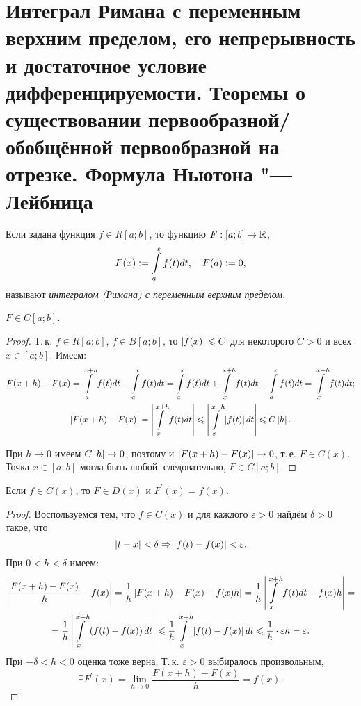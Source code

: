 \section{Интеграл Римана с переменным верхним пределом, его непрерывность и достаточное условие дифференцируемости. Теоремы о существовании первообразной/обобщённой первообразной на отрезке. Формула Ньютона "---Лейбница}

\begin{definition}
    Если задана функция $f \in R[a; b]$, то функцию $F: [a; b] \to \mathbb{R}$,
    \[
        F(x) \vcentcolon = \int\limits_a^xf(t)dt,\quad F(a) \vcentcolon = 0,
    \]
    называют \textit{интегралом (Римана) с переменным верхним пределом}.
\end{definition}

\begin{theorem}
    $F \in C[a; b]$.
\end{theorem}

\begin{proof}
    Т.\,к. $f \in R[a; b]$, $f \in B[a; b]$, то $\left\lvert f(x)\right\rvert \leqslant C$ для некоторого $C > 0$ и всех $x \in [a; b]$. Имеем:
    \begin{gather*}
        F(x + h) - F(x) = \int\limits_a^{x + h}f(t)dt - \int\limits_a^xf(t)dt = \int\limits_a^xf(t)dt + \int\limits_x^{x + h}f(t)dt - \int\limits_a^xf(t)dt = \int\limits_x^{x + h}f(t)dt;\\
        \left\lvert F(x + h) - F(x)\right\rvert = \left\lvert\int\limits_x^{x + h}f(t)dt\right\rvert \leqslant \left\lvert\int\limits_x^{x + h}\left\lvert f(t)\right\rvert dt\right\rvert \leqslant C\left\lvert h\right\rvert.
    \end{gather*}

    При $h \to 0$ имеем $C\left\lvert h\right\rvert \to 0$, поэтому и $\left\lvert F(x + h) - F(x)\right\rvert \to 0$, т.\,е. $F \in C(x)$. Точка $x \in [a; b]$ могла быть любой, следовательно, $F \in C[a; b]$.
\end{proof}

\begin{theorem}
    Если $f \in C(x)$, то $F \in D(x)$ и $F^\prime(x) = f(x)$.
\end{theorem}

\begin{proof}
    Воспользуемся тем, что $f \in C(x)$ и для каждого $\varepsilon > 0$ найдём $\delta > 0$ такое, что
    \[
        \left\lvert t - x\right\rvert < \delta \Rightarrow \left\lvert f(t) - f(x)\right\rvert < \varepsilon.
    \]
    При $0 < h < \delta$ имеем:
    \begin{multline*}
        \left\lvert\frac{F(x + h) - F(x)}{h} - f(x)\right\rvert = \frac{1}{h}\left\lvert F(x + h) - F(x) - f(x)h\right\rvert = \frac{1}{h}\left\lvert\int\limits_x^{x + h}f(t)dt - f(x)h\right\rvert =\\ = \frac{1}{h}\left\lvert\int\limits_x^{x + h}\left(f(t) - f(x)\right)dt\right\rvert \leqslant \frac{1}{h}\int\limits_x^{x + h}\left\lvert f(t) - f(x)\right\rvert dt \leqslant \frac{1}{h} \cdot \varepsilon h = \varepsilon.
    \end{multline*}
    При $-\delta < h < 0$ оценка тоже верна. Т.\,к. $\varepsilon > 0$ выбиралось произвольным,
    \[
        \exists F^\prime(x) = \lim\limits_{h \to 0}\frac{F(x + h) - F(x)}{h} = f(x).
    \]
\end{proof}


